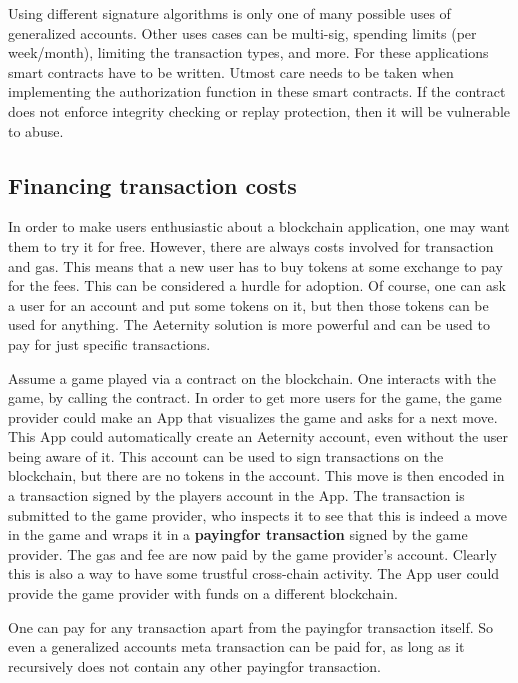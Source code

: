 Using different signature algorithms is only one of many possible uses
of generalized accounts. Other uses cases can be multi-sig, spending
limits (per week/month), limiting the transaction types, and more. For
these applications smart contracts have to be written. Utmost care
needs to be taken when implementing the authorization
function in these smart contracts. If the contract does not enforce
integrity checking or replay protection, then it will be vulnerable to
abuse.


\subsection{Financing transaction costs}
\label{sect:payingfor}

In order to make users enthusiastic about a blockchain application,
one may want them to try it for free. However, there are always costs
involved for transaction and gas. This means that a new user has to
buy tokens at some exchange to pay for the fees. This can be considered
a hurdle for adoption. Of course, one can ask a user for an account and put
some tokens on it, but then those tokens can be used for anything.
The Aeternity solution is more powerful and can be used to pay for
just specific transactions.

Assume a game played via a contract on the blockchain. One interacts
with the game, by calling the contract. In order to get more users for
the game, the game provider could make an App that visualizes
the game and asks for a next move. This App could automatically create
an Aeternity account, even without the user being aware of it. This
account can be used to sign transactions on the blockchain, but there
are no tokens in the account. This move is then encoded in a
transaction signed by the players account in the App. The transaction
is submitted to the game provider, who inspects it to see that this
is indeed a move in the game and wraps it in a \textbf{payingfor
  transaction} signed by the game provider. The gas and fee are now
paid by the game provider's account.
Clearly this is also a way to have some trustful cross-chain
activity. The App user could provide the game provider with funds on a
different blockchain.

One can pay for any transaction apart from the payingfor transaction
itself. So even a generalized accounts meta transaction can be paid
for, as long as it recursively does not contain any other payingfor
transaction.
